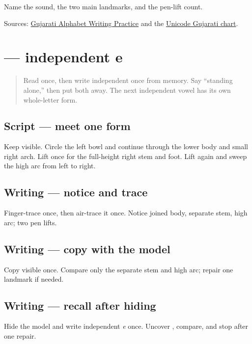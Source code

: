 \begin{tcolorbox}[breakable,colback=teal!4,colframe=teal!35!black,title={Before you move on}]
Name the sound, the two main landmarks, and the pen-lift count.

Sources: \href{https://www.t30apps.com/gujarati-alphabet-writing/}{Gujarati Alphabet Writing Practice} and the \href{https://www.unicode.org/charts/PDF/U0A80.pdf}{Unicode Gujarati chart}.
\end{tcolorbox}
\section[\texorpdfstring{\gu{એ} (e)}{એ (e)}]{ — independent e}

\label{lesson:GU-W06-independent-e}



\begin{quote}
Read \textbf{} once, then write independent \textbf{} once from memory. Say “standing alone,” then put both away. The next independent vowel has its own whole-letter form.
\end{quote}

\subsection*{Script — meet one form}
Keep \textbf{} visible. Circle the left bowl and continue through the lower body and small right arch. Lift once for the full-height right stem and foot. Lift again and sweep the high arc from left to right.

\subsection*{Writing — notice and trace}

Finger-trace \textbf{} once, then air-trace it once. Notice joined body, separate stem, high arc; two pen lifts.

\subsection*{Writing — copy with the model}
Copy visible \textbf{} once. Compare only the separate stem and high arc; repair one landmark if needed.

\subsection*{Writing — recall after hiding}
Hide the model and write independent \emph{e} once. Uncover \textbf{}, compare, and stop after one repair.

